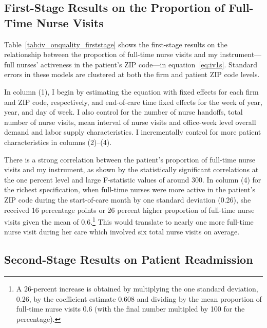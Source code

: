\documentclass[final,12pt]{article}
\begin{document}
\subsection{First-Stage Results on the Proportion of Full-Time Nurse Visits}
Table~\ref{tab:iv_onquality_firststage} shows the first-stage results on the relationship between the proportion of full-time nurse visits and my instrument---full nurses' activeness in the patient's ZIP code---in equation~\eqref{eq:iv1s}.
Standard errors in these models are clustered at both the firm and patient ZIP code levels.

In column (1), I begin by estimating the equation with fixed effects for each firm and ZIP code, respectively, and end-of-care time fixed effects for the week of year, year, and day of week. I also control for the number of nurse handoffs, total number of nurse visits, mean interval of nurse visits and office-week level overall demand and labor supply characteristics.
I incrementally control for more patient characteristics in columns (2)--(4).

There is a strong correlation between the patient's proportion of full-time nurse visits and my instrument, as shown by the statistically significant correlations at the one percent level and large F-statistic values of around 300.
In column (4) for the richest specification, when full-time nurses were more active in the patient's ZIP code during the start-of-care month by one standard deviation (0.26), she received 16 percentage points or 26 percent higher proportion of full-time nurse visits given the mean of 0.6.\footnote{A 26-percent increase is obtained by multiplying the one standard deviation, 0.26, by the coefficient estimate 0.608 and dividing by the mean proportion of full-time nurse visits 0.6 (with the final number multipled by 100 for the percentage).}
This would translate to nearly one more full-time nurse visit during her care which involved six total nurse visits on average.




\subsection{Second-Stage Results on Patient Readmission}
\end{document}
